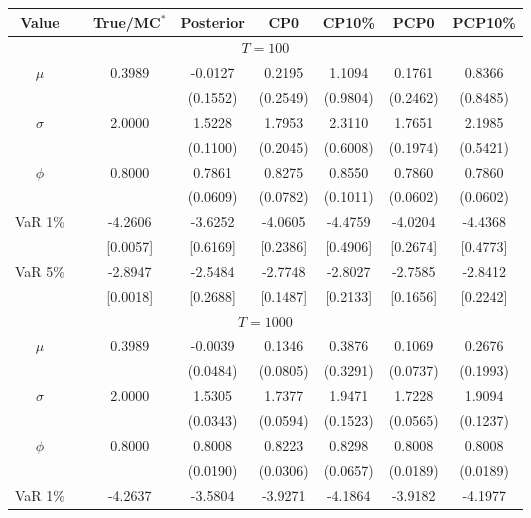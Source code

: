 { \renewcommand{\arraystretch}{1.2} 
{\footnotesize
\begin{table} 
\center 
\begin{tabular}{cc cccccc} 
Value & & True/MC$^*$ & Posterior & CP0  & CP10\% & PCP0  & PCP10\% \\ \hline 
\hline 
\multicolumn{8}{c}{$T =100$}  \\ 
\hline 
\rowcolor{LightCyan} $\mu$&& 0.3989 & -0.0127 & 0.2195 & 1.1094 & 0.1761 & 0.8366 \\ 
&&   & (0.1552) & (0.2549) & (0.9804) & (0.2462) & (0.8485) \\ 
\rowcolor{LightCyan} $\sigma$&& 2.0000 & 1.5228 & 1.7953 & 2.3110 & 1.7651 & 2.1985 \\ 
&&   & (0.1100) & (0.2045) & (0.6008) & (0.1974) & (0.5421) \\ 
\rowcolor{LightCyan} $\phi$&& 0.8000 & 0.7861 & 0.8275 & 0.8550 & 0.7860 & 0.7860 \\ 
&&   & (0.0609) & (0.0782) & (0.1011) & (0.0602) & (0.0602) \\ 
\rowcolor{LightCyan} VaR 1\% && -4.2606 & -3.6252 & -4.0605 & -4.4759 & -4.0204 & -4.4368 \\ 
  && [0.0057] & [0.6169] & [0.2386] & [0.4906] & [0.2674] & [0.4773] \\ 
\rowcolor{LightCyan} VaR 5\% && -2.8947 & -2.5484 & -2.7748 & -2.8027 & -2.7585 & -2.8412 \\ 
 && [0.0018] & [0.2688] & [0.1487] & [0.2133] & [0.1656] & [0.2242] \\ 
\hline 
\multicolumn{8}{c}{$T =1000$}  \\ 
\hline 
\rowcolor{LightCyan} $\mu$&& 0.3989 & -0.0039 & 0.1346 & 0.3876 & 0.1069 & 0.2676 \\ 
&&   & (0.0484) & (0.0805) & (0.3291) & (0.0737) & (0.1993) \\ 
\rowcolor{LightCyan} $\sigma$&& 2.0000 & 1.5305 & 1.7377 & 1.9471 & 1.7228 & 1.9094 \\ 
&&   & (0.0343) & (0.0594) & (0.1523) & (0.0565) & (0.1237) \\ 
\rowcolor{LightCyan} $\phi$&& 0.8000 & 0.8008 & 0.8223 & 0.8298 & 0.8008 & 0.8008 \\ 
&&   & (0.0190) & (0.0306) & (0.0657) & (0.0189) & (0.0189) \\ 
\rowcolor{LightCyan} VaR 1\% && -4.2637 & -3.5804 & -3.9271 & -4.1864 & -3.9182 & -4.1977 \\ 

\end{tabular}
\end{table}}}
